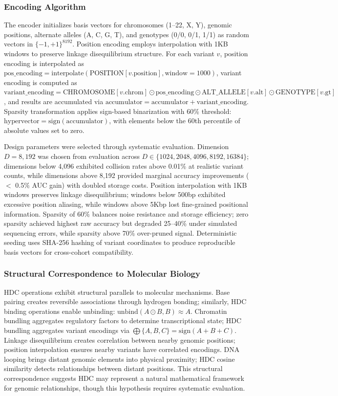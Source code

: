 \documentclass[11pt,letterpaper]{article}
\begin{document}
\subsubsection{Encoding Algorithm}

The encoder initializes basis vectors for chromosomes (1--22, X, Y), genomic positions, alternate alleles (A, C, G, T), and genotypes (0/0, 0/1, 1/1) as random vectors in $\{-1,+1\}^{8192}$. Position encoding employs interpolation with 1KB windows to preserve linkage disequilibrium structure. For each variant $v$, position encoding is interpolated as $\text{pos\_encoding} = \text{interpolate}(\text{POSITION}[v.\text{position}], \text{window}=1000)$, variant encoding is computed as $\text{variant\_encoding} = \text{CHROMOSOME}[v.\text{chrom}] \odot \text{pos\_encoding} \odot \text{ALT\_ALLELE}[v.\text{alt}] \odot \text{GENOTYPE}[v.\text{gt}]$, and results are accumulated via $\text{accumulator} = \text{accumulator} + \text{variant\_encoding}$. Sparsity transformation applies sign-based binarization with 60\% threshold: $\text{hypervector} = \text{sign}(\text{accumulator})$, with elements below the 60th percentile of absolute values set to zero.

Design parameters were selected through systematic evaluation. Dimension $D = 8,192$ was chosen from evaluation across $D \in \{1024, 2048, 4096, 8192, 16384\}$; dimensions below 4,096 exhibited collision rates above 0.01\% at realistic variant counts, while dimensions above 8,192 provided marginal accuracy improvements ($<$ 0.5\% AUC gain) with doubled storage costs. Position interpolation with 1KB windows preserves linkage disequilibrium; windows below 500bp exhibited excessive position aliasing, while windows above 5Kbp lost fine-grained positional information. Sparsity of 60\% balances noise resistance and storage efficiency; zero sparsity achieved highest raw accuracy but degraded 25--40\% under simulated sequencing errors, while sparsity above 70\% over-pruned signal. Deterministic seeding uses SHA-256 hashing of variant coordinates to produce reproducible basis vectors for cross-cohort compatibility.

\subsubsection{Structural Correspondence to Molecular Biology}

HDC operations exhibit structural parallels to molecular mechanisms. Base pairing creates reversible associations through hydrogen bonding; similarly, HDC binding operations enable unbinding: $\text{unbind}(A \odot B, B) \approx A$. Chromatin bundling aggregates regulatory factors to determine transcriptional state; HDC bundling aggregates variant encodings via $\bigoplus\{A, B, C\} = \text{sign}(A + B + C)$. Linkage disequilibrium creates correlation between nearby genomic positions; position interpolation ensures nearby variants have correlated encodings. DNA looping brings distant genomic elements into physical proximity; HDC cosine similarity detects relationships between distant positions. This structural correspondence suggests HDC may represent a natural mathematical framework for genomic relationships, though this hypothesis requires systematic evaluation.
\end{document}
